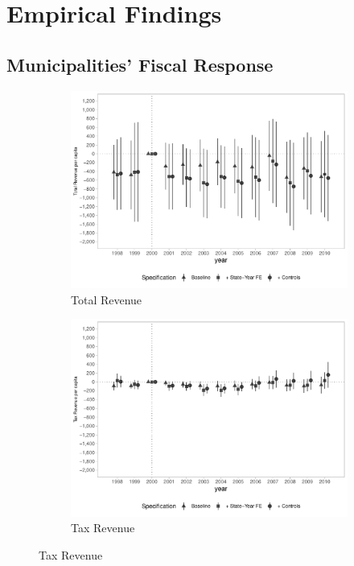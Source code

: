 \section{Empirical Findings}\label{sec:emp}

\subsection{Municipalities' Fiscal Response}





\begin{figure}[h]
    \begin{center}
    \caption{Causal Effects on Revenues per capita}\label{fig:revenue1}
    \begin{subfigure}{0.49\textwidth}
        \caption{\scriptsize Total Revenue}\label{fig:rev1_a}
        \centering
        \includegraphics[width=\textwidth]{plots/spending/finbra_reccorr_pcapita_dist_ec29_baseline_dist_ec29_baseline_full.pdf}
    \end{subfigure}
    \begin{subfigure}{0.49\textwidth}
        \centering
        \caption{\scriptsize Tax Revenue}\label{fig:rev1_b}
        \includegraphics[width=\textwidth]{plots/spending/finbra_rectribut_pcapita_dist_ec29_baseline_dist_ec29_baseline_full.pdf}

\end{subfigure}
\end{center}
\end{figure}
